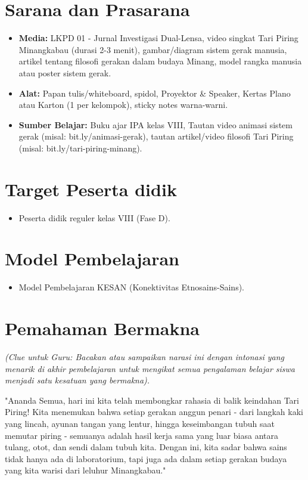 \documentclass[a4paper,12pt]{article}
\begin{document}
\section{Sarana dan Prasarana}

\begin{itemize}
\item \textbf{Media:} LKPD 01 - Jurnal Investigasi Dual-Lensa, video singkat Tari Piring Minangkabau (durasi 2-3 menit), gambar/diagram sistem gerak manusia, artikel tentang filosofi gerakan dalam budaya Minang, model rangka manusia atau poster sistem gerak.
\item \textbf{Alat:} Papan tulis/whiteboard, spidol, Proyektor \& Speaker, Kertas Plano atau Karton (1 per kelompok), sticky notes warna-warni.
\item \textbf{Sumber Belajar:} Buku ajar IPA kelas VIII, Tautan video animasi sistem gerak (misal: bit.ly/animasi-gerak), tautan artikel/video filosofi Tari Piring (misal: bit.ly/tari-piring-minang).
\end{itemize}

\section{Target Peserta didik}

\begin{itemize}
\item Peserta didik reguler kelas VIII (Fase D).
\end{itemize}

\section{Model Pembelajaran}

\begin{itemize}
\item Model Pembelajaran KESAN (Konektivitas Etnosains-Sains).
\end{itemize}

\section{Pemahaman Bermakna}
\textit{(Clue untuk Guru: Bacakan atau sampaikan narasi ini dengan intonasi yang menarik di akhir pembelajaran untuk mengikat semua pengalaman belajar siswa menjadi satu kesatuan yang bermakna).}

\begin{tcolorbox}[sectionbox]
"Ananda Semua, hari ini kita telah membongkar rahasia di balik keindahan Tari Piring! Kita menemukan bahwa setiap gerakan anggun penari - dari langkah kaki yang lincah, ayunan tangan yang lentur, hingga keseimbangan tubuh saat memutar piring - semuanya adalah hasil kerja sama yang luar biasa antara tulang, otot, dan sendi dalam tubuh kita. Dengan ini, kita sadar bahwa sains tidak hanya ada di laboratorium, tapi juga ada dalam setiap gerakan budaya yang kita warisi dari leluhur Minangkabau."
\end{tcolorbox}
\end{document}
